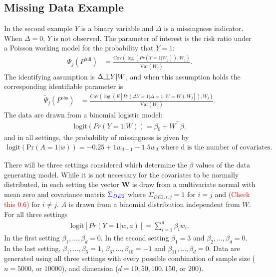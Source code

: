 \documentclass{article}
\newcommand{\pr}{\text{Pr}}
\newcommand{\indep}{\raisebox{0.05em}{\rotatebox[origin=c]{90}{$\models$}}}
\begin{document}
\subsection{Missing Data Example}
\label{sec:missing_data}
In the second example $Y$ is a binary variable and $\Delta$ is a missingness indicator.  When $\Delta = 0$, $Y$ is not observed. The parameter of interest is the risk ratio under a Poisson working model for the probability that $Y = 1$:
\begin{align*}
	\Psi_{j}\left(P^{\text{full}}\right) &= \frac{\text{Cov}\left(\log\left(Pr \left(Y = 1 |  W_j\right)\right), W_j\right)}{\text{Var}(W_j)}.
\end{align*}
The identifying assumption is $\Delta \indep Y | W$, and when this assumption holds the corresponding identifiable parameter is
\begin{align*}
	\tilde{\Psi}_{j}\left(P^{\text{obs}}\right)&= \frac{\text{Cov}\left(\log\left(E\left[Pr \left(\Delta  Y = 1 | \Delta = 1, W = W\right) |  W_j\right]\right), W_j\right)}{\text{Var}(W_j)}.
\end{align*}
The data are drawn from a binomial logistic model:
\begin{align*}
\text{logit}(Pr(Y = 1 | W)) = \beta_0 + W^\top \beta.
\end{align*}
and in all settings, the probability of missingness is given by 
\begin{align*}
	\text{logit}(\pr(A = 1 | w)) = -0.25 + 1 w_{d - 1} - 1.5 w_d \text{ where d is the number of covariates.} 
\end{align*}

There will be three settings considered which determine  the $\beta$ values of the data generating model.  While it is not necessary for the covariates to be normally distributed, in each setting the vector $\boldsymbol{W}$ is draw from a multivariate normal with mean zero and covariance matrix $\textcolor{blue}{\Sigma_{DE2}}$ where $\Sigma_{DE2, i, j} = 1$ for $i = j$ and \textcolor{red}{(Check this $0.6$)} for $i \neq j$. $A$ is drawn from a binomial distribution independent from $W$.  For all three settings 
\begin{align*}
	\text{logit}\left[Pr(Y = 1 | w, a)\right] = \sum_{i = 1}^{d} \beta_{i} w_i.
\end{align*}
In the first setting $\beta_1, \dots, \beta_d = 0$.  In the second setting $\beta_1 = 3$ and $\beta_2, \dots,  \beta_d = 0$.  In the last setting, $\beta_1, \dots, \beta_5 = 1$, $\beta_6, \dots, \beta_{10} = -1$ and $\beta_{11}, \dots, \beta_d = 0$.  Data are generated using all three settings with every possible combination of sample size ($n = 5000$, or $10000$), and dimension ($d = 10, 50, 100, 150$, or $200$).
\end{document}

